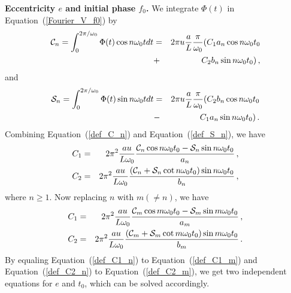 \documentclass[twocolumn]{aastex62}
\def\m{\begin{eqnarray}}
\def\n{\end{eqnarray}}
\begin{document}
{\bf Eccentricity $e$ and initial phase $f_0$.} We  integrate $\Phi(t)$ in Equation~(\ref{Fourier_V_f0}) by
\m \label{def_C_n}
{\mathcal{C}}_n=\int^{2\pi/\omega_0}_{0}\Phi(t) \cos{n \omega_0 t} dt&=&2 \pi u {a\over L} {\pi\over \omega_0} (C_1 a_n \cos{n \omega_0 t_0}  \nonumber\\
&+& C_2 b_n \sin{n \omega_0 t_0} ) \,,
\n
and
\m \label{def_S_n}
{\mathcal{S}}_n=\int^{2\pi/\omega_0}_{0}\Phi(t) \sin{n \omega_0 t} dt&=&2 \pi u {a\over L} {\pi\over \omega_0} (C_2 b_n \cos{n \omega_0 t_0}  \nonumber\\
&-& C_1 a_n \sin{n \omega_0 t_0} ) \,.
\n
Combining Equation~(\ref{def_C_n}) and Equation~(\ref{def_S_n}), we have 
\m \label{def_C1_n}
C_1 &=&2 {\pi}^2 {a u\over L \omega_0} {{\mathcal{C}}_n \cos{n \omega_0 t_0} - {\mathcal{S}}_n \sin{n \omega_0 t_0} \over a_n} \,, \\
\label{def_C2_n}
C_2 &=&2 {\pi}^2 {a u\over L \omega_0} {({\mathcal{C}}_n + {\mathcal{S}}_n \cot{n \omega_0 t_0} ) \sin{n \omega_0 t_0} \over b_n}\,,
\n
where $n\geq 1$. Now replacing $n$ with $m (\neq n)$, we have 
\m \label{def_C1_m}
C_1&=& 2 {\pi}^2 {a u\over L \omega_0} {{\mathcal{C}}_m \cos{m \omega_0 t_0} - {\mathcal{S}}_m \sin{m \omega_0 t_0} \over a_m}\,, \\
\label{def_C2_m}
C_2&=& 2 {\pi}^2 {a u\over L \omega_0} {({\mathcal{C}}_m + {\mathcal{S}}_m \cot{m \omega_0 t_0} ) \sin{m \omega_0 t_0} \over b_m}\,.
\n
By equaling Equation~(\ref{def_C1_n}) to Equation~(\ref{def_C1_m}) and Equation~(\ref{def_C2_n}) to Equation~(\ref{def_C2_m}), we get two independent equations for $e$ and $t_0$, which can be solved accordingly.
%
\end{document}
